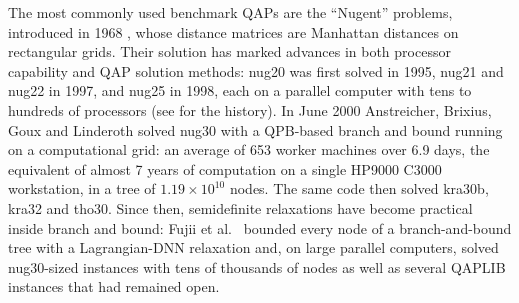 \documentclass[10pt]{article}
\theoremstyle{remark}
\begin{document}
The most commonly used benchmark QAPs are the ``Nugent'' problems, introduced in
1968 \cite{nugent}, whose distance matrices are Manhattan distances on rectangular
grids. Their solution has marked advances in both processor capability and QAP
solution methods: nug20 was first solved in 1995, nug21 and nug22 in 1997, and nug25
in 1998, each on a parallel computer with tens to hundreds of processors (see
\cite{abgl} for the history). In June 2000 Anstreicher, Brixius, Goux and Linderoth
\cite{abgl} solved nug30 with a QPB-based branch and bound running on a
computational grid: an average of 653 worker machines over 6.9 days, the
equivalent of almost 7 years of computation on a single HP9000 C3000 workstation,
in a tree of $1.19\times10^{10}$ nodes. The same code then solved kra30b, kra32 and
tho30. Since then, semidefinite relaxations have become practical inside branch and
bound: Fujii et al.\ \cite{fujii} bounded every node of a branch-and-bound tree
with a Lagrangian-DNN relaxation and, on large parallel computers, solved
nug30-sized instances with tens of thousands of nodes as well as several QAPLIB
instances that had remained open.
\end{document}
